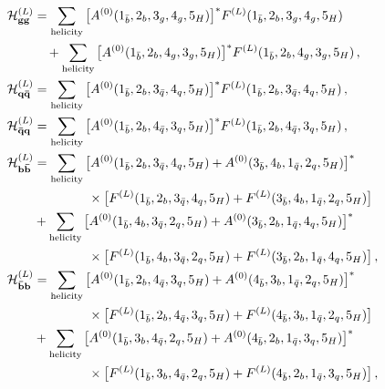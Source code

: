 \documentclass[main.tex]{subfiles}
\begin{document}
\begingroup
\allowdisplaybreaks
\begin{align}
\label{eq:channel_gg}
\mathcal{H}^{(L)}_{\mathbf{gg}} & = \sumhel \big[A^{(0)}(1_{\bar b},2_{b},3_{g},4_{g} ,5_{H})\big]^* F^{(L)}(1_{\bar b},2_{b},3_{g},4_{g} ,5_{H})  \nn
                                & \quad + \sumhel \big[A^{(0)}(1_{\bar b},2_{b},4_{g},3_{g} ,5_{H})\big]^* F^{(L)}(1_{\bar b},2_{b},4_{g},3_{g} ,5_{H}) \,, \\
%
\label{eq:channel_qQ}
\mathcal{H}^{(L)}_{\mathbf{q\bar{q}}} & = \sumhel \big[A^{(0)}(1_{\bar b},2_{b},3_{\bar{q}},4_{q} ,5_{H})\big]^* F^{(L)}(1_{\bar b},2_{b},3_{\bar{q}},4_{q} ,5_{H}) \,, \\
%
\label{eq:channel_Qq}
\mathcal{H}^{(L)}_{\mathbf{\bar{q}q}} & = \sumhel \big[A^{(0)}(1_{\bar b},2_{b},4_{\bar{q}},3_{q} ,5_{H})\big]^* F^{(L)}(1_{\bar b},2_{b},4_{\bar{q}},3_{q} ,5_{H}) \,, \\
%
\label{eq:channel_bB}
\mathcal{H}^{(L)}_{\mathbf{b\bar{b}}} & = \sumhel \big[ A^{(0)}(1_{\bar b},2_{b},3_{\bar{q}},4_{q} ,5_{H}) + A^{(0)}(3_{\bar b},4_{b},1_{\bar{q}},2_{q} ,5_{H}) \big]^*  \nn
                                      &   \hspace{1.5cm} \times  \big[ F^{(L)}(1_{\bar b},2_{b},3_{\bar{q}},4_{q} ,5_{H}) + F^{(L)}(3_{\bar b},4_{b},1_{\bar{q}},2_{q} ,5_{H}) \big] \nn
                                      &  + \sumhel  \big[ A^{(0)}(1_{\bar b},4_{b},3_{\bar{q}},2_{q} ,5_{H}) + A^{(0)}(3_{\bar b},2_{b},1_{\bar{q}},4_{q} ,5_{H}) \big]^*  \nn
                                      &   \hspace{1.5cm} \times  \big[ F^{(L)}(1_{\bar b},4_{b},3_{\bar{q}},2_{q} ,5_{H}) + F^{(L)}(3_{\bar b},2_{b},1_{\bar{q}},4_{q} ,5_{H}) \big] \,, \\
%
\label{eq:channel_Bb}
\mathcal{H}^{(L)}_{\mathbf{\bar{b}b}} & = \sumhel       \big[ A^{(0)}(1_{\bar b},2_{b},4_{\bar{q}},3_{q} ,5_{H}) + A^{(0)}(4_{\bar b},3_{b},1_{\bar{q}},2_{q} ,5_{H}) \big]^*  \nn
                                      &   \hspace{1.5cm} \times  \big[ F^{(L)}(1_{\bar b},2_{b},4_{\bar{q}},3_{q} ,5_{H}) + F^{(L)}(4_{\bar b},3_{b},1_{\bar{q}},2_{q} ,5_{H}) \big] \nn
                                      &  + \sumhel    \big[ A^{(0)}(1_{\bar b},3_{b},4_{\bar{q}},2_{q} ,5_{H}) + A^{(0)}(4_{\bar b},2_{b},1_{\bar{q}},3_{q} ,5_{H}) \big]^*  \nn
                                      &   \hspace{1.5cm} \times  \big[ F^{(L)}(1_{\bar b},3_{b},4_{\bar{q}},2_{q} ,5_{H}) + F^{(L)}(4_{\bar b},2_{b},1_{\bar{q}},3_{q} ,5_{H}) \big] \,, \\

\end{align}
\end{document}
